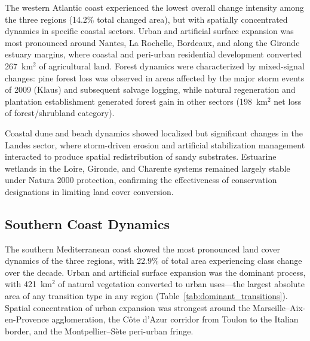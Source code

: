 \documentclass[coasts,article,submit,pdftex,moreauthors]{Definitions/mdpi}
\begin{document}
The western Atlantic coast experienced the lowest overall change intensity among the three regions (14.2\% total changed area), but with spatially concentrated dynamics in specific coastal sectors. Urban and artificial surface expansion was most pronounced around Nantes, La Rochelle, Bordeaux, and along the Gironde estuary margins, where coastal and peri-urban residential development converted 267~km$^2$ of agricultural land. Forest dynamics were characterized by mixed-signal changes: pine forest loss was observed in areas affected by the major storm events of 2009 (Klaus) and subsequent salvage logging, while natural regeneration and plantation establishment generated forest gain in other sectors (198~km$^2$ net loss of forest/shrubland category).

Coastal dune and beach dynamics showed localized but significant changes in the Landes sector, where storm-driven erosion and artificial stabilization management interacted to produce spatial redistribution of sandy substrates. Estuarine wetlands in the Loire, Gironde, and Charente systems remained largely stable under Natura 2000 protection, confirming the effectiveness of conservation designations in limiting land cover conversion.

\subsection{Southern Coast Dynamics}

The southern Mediterranean coast showed the most pronounced land cover dynamics of the three regions, with 22.9\% of total area experiencing class change over the decade. Urban and artificial surface expansion was the dominant process, with 421~km$^2$ of natural vegetation converted to urban uses—the largest absolute area of any transition type in any region (Table~\ref{tab:dominant_transitions}). Spatial concentration of urban expansion was strongest around the Marseille--Aix-en-Provence agglomeration, the Côte d'Azur corridor from Toulon to the Italian border, and the Montpellier--Sète peri-urban fringe.
\end{document}
